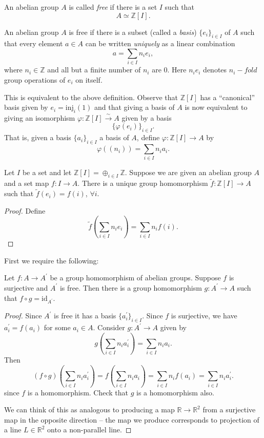 \begin{defn}
An abelian group $A$ is called \emph{free} if there is a set $I$ such
that
$$
A \simeq \mathbb{Z}[I].
$$
\end{defn}

\begin{defn}[Equivalent]
An abelian group $A$ is free if there is a subset (called a \emph{basis})
$\{ e_i \}_{i \in I}$ of $A$ such that every element $a \in A$ can be
written \emph{uniquely} as a linear combination
$$
a = \sum_{i \in I} n_i e_i,
$$
where $n_i \in \mathbb{Z}$ and all but a finite number of $n_i$ are 0.
Here $n_i e_i$ denotes $n_i-fold$ group
operations of $e_i$ on itself.

This is equivalent to the above definition. Observe that
$\mathbb{Z}[I]$ has a ``canonical'' basis given by
$e_i = \mathrm{inj}_i(1)$ and that giving a basis of $A$ is now
equivalent to giving an isomorphism
$\varphi : \mathbb{Z}[I] \xrightarrow{\sim} A$ given by a basis
$$
\{\varphi(e_i)\}_{i \in I}.
$$
That is, given a basis $\{ a_i \}_{i \in I}$ a basis of $A$, define
$\varphi : \mathbb{Z}[I] \to A$ by
$$
\varphi((n_i)) = \sum_{i \in I} n_i a_i.
$$
\end{defn}

\begin{prop}
Let $I$ be a set and let
$\mathbb{Z}[I] = \oplus_{i \in I} \mathbb{Z}$.
Suppose we are given an abelian group $A$ and a set map
$f : I \to A$. There is a unique group homomorphism
$\tilde{f} : \mathbb{Z}[I] \to A$ such that
$\tilde{f}(e_i) = f(i)$, $\forall i$.
\end{prop}

\begin{proof}
Define
$$
\tilde{f}\left(\sum_{i \in I} n_i e_i\right)
= \sum_{i \in I} n_i f(i).
$$
\end{proof}

First we require the following:
\begin{lemma}
Let $f : A \to A^\prime$ be a group homomorphism of abelian
groups. Suppose $f$ is surjective and $A^\prime$ is free. Then there
is a group homomorphism $g : A^\prime \to A$ such that
$f \circ g = \mathrm{id}_{A^\prime}$.
\end{lemma}
\begin{proof}
Since $A^\prime$ is free it has a basis $\{ a_i^\prime \}_{i \in
  I}$. Since $f$ is surjective, we have $a_i^\prime = f(a_i)$ for some
$a_i \in A$. Consider $g : A^\prime \to A$ given by
$$
g\left(\sum_{i \in I} n_i a_i^\prime\right) = \sum_{i \in I} n_i a_i.
$$
Then
$$
(f \circ g)\left(\sum_{i \in I} n_i a_i^\prime\right)
= f\left(\sum_{i \in I} n_i a_i\right)
= \sum_{i \in I} n_i f(a_i)
= \sum_{i \in I} n_i a_i^\prime.
$$
since $f$ is a homomorphism. Check that $g$ is a homomorphism also.

We can think of this as analogous to producing a map
$\mathbb{R} \to \mathbb{R}^2$ from a surjective map in the opposite
direction -- the map we produce corresponds to projection of a line
$L \in \mathbb{R}^2$ onto a non-parallel line.
\end{proof}

